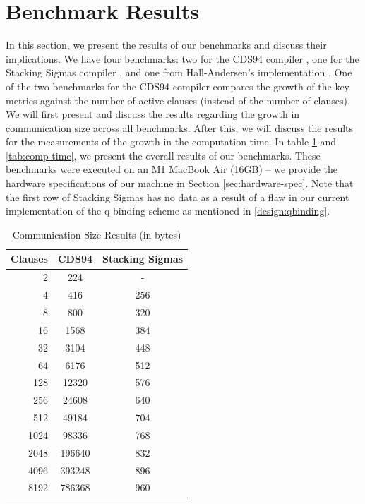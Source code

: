 \section{Benchmark Results}\label{eval:benchmarks}
In this section, we present the results of our benchmarks and discuss their 
implications. We have four benchmarks: two for the CDS94 compiler \cite{CDS94}, 
one for the Stacking Sigmas compiler \cite{StackingSigmas}, and one from Hall-Andersen's implementation \cite{MHAStackSig}. One of the two benchmarks for the CDS94 compiler compares 
the growth of the key metrics against the number of active clauses (instead of the number of clauses). We will first present and discuss the results regarding the 
growth in communication size across all benchmarks. After this, we will discuss
the results for the measurements of the growth in the computation time. In table \ref{tab:comm-size} and 
\ref{tab:comp-time}, we present the overall results of our benchmarks. These benchmarks were executed on an M1 MacBook Air (16GB) -- we provide the hardware specifications of our machine in Section \ref{sec:hardware-spec}. Note that the first row of Stacking Sigmas has no data as a result of a flaw in our current implementation of the q-binding scheme as mentioned in \ref{design:qbinding}.
\begin{table}[H]
  \centering\caption{Communication Size Results (in bytes)} 
  \label{tab:comm-size}
  \begin{tabular}{rcc}
    \toprule
    \textbf{Clauses} & \textbf{CDS94} & \textbf{Stacking Sigmas} \\
    \midrule
    2 & 224 & - \\
    4 & 416 & 256 \\
    8 & 800 & 320 \\
    16 & 1568 & 384 \\
    32 & 3104 & 448 \\
    64 & 6176 & 512 \\
    128 & 12320 & 576 \\
    256 & 24608 & 640 \\
    512 & 49184 & 704 \\
    1024 & 98336 & 768 \\
    2048 & 196640 & 832 \\
    4096 & 393248 & 896 \\
    8192 & 786368 & 960 \\
    \bottomrule
  \end{tabular}
\end{table}

